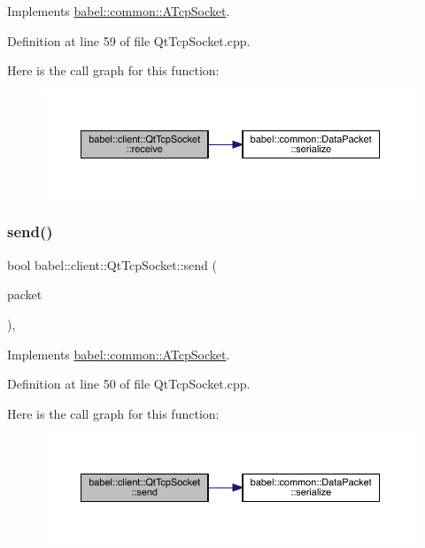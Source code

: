 Implements \mbox{\hyperlink{classbabel_1_1common_1_1_a_tcp_socket_a8bfec8f1b34e75429f9e912ed7108936}{babel\+::common\+::\+A\+Tcp\+Socket}}.



Definition at line 59 of file Qt\+Tcp\+Socket.\+cpp.

Here is the call graph for this function\+:\nopagebreak
\begin{figure}[H]
\begin{center}
\leavevmode
\includegraphics[width=350pt]{classbabel_1_1client_1_1_qt_tcp_socket_ac79df4ffe6efc050afe567c596754e5c_cgraph}
\end{center}
\end{figure}
\mbox{\label{classbabel_1_1client_1_1_qt_tcp_socket_a8f6bdb14b7b6742f11cf1d9e4e39e09d}} 
\subsubsection{\texorpdfstring{send()}{send()}}
{\footnotesize\ttfamily bool babel\+::client\+::\+Qt\+Tcp\+Socket\+::send (\begin{DoxyParamCaption}\item[{\mbox{\hyperlink{classbabel_1_1common_1_1_data_packet}{common\+::\+Data\+Packet}}}]{packet }\end{DoxyParamCaption})\hspace{0.3cm}{\ttfamily [override]}, {\ttfamily [virtual]}}



Implements \mbox{\hyperlink{classbabel_1_1common_1_1_a_tcp_socket_a4c6b77b93cedcb874caa0a9cee6cad36}{babel\+::common\+::\+A\+Tcp\+Socket}}.



Definition at line 50 of file Qt\+Tcp\+Socket.\+cpp.

Here is the call graph for this function\+:\nopagebreak
\begin{figure}[H]
\begin{center}
\leavevmode
\includegraphics[width=350pt]{classbabel_1_1client_1_1_qt_tcp_socket_a8f6bdb14b7b6742f11cf1d9e4e39e09d_cgraph}
\end{center}
\end{figure}


